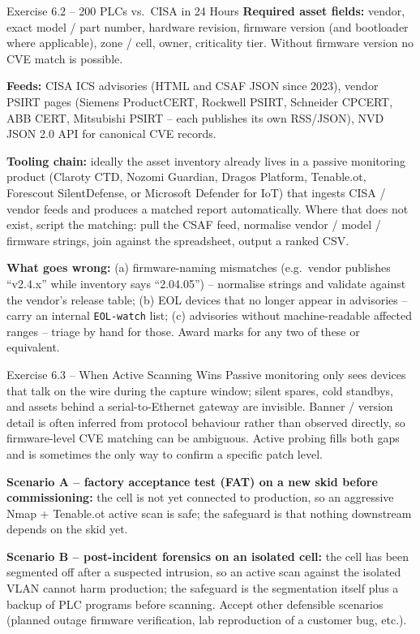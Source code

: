 \documentclass[11pt,a4paper]{article}
\begin{document}
\begin{taskbox}{Exercise 6.2 -- 200 PLCs vs.\ CISA in 24 Hours}
\textbf{Required asset fields:} vendor, exact model / part number,
hardware revision, firmware version (and bootloader where
applicable), zone / cell, owner, criticality tier. Without firmware
version no CVE match is possible.

\textbf{Feeds:} CISA ICS advisories (HTML and CSAF JSON since 2023),
vendor PSIRT pages (Siemens ProductCERT, Rockwell PSIRT, Schneider
CPCERT, ABB CERT, Mitsubishi PSIRT -- each publishes its own
RSS/JSON), NVD JSON 2.0 API for canonical CVE records.

\textbf{Tooling chain:} ideally the asset inventory already lives in
a passive monitoring product (Claroty CTD, Nozomi Guardian, Dragos
Platform, Tenable.ot, Forescout SilentDefense, or Microsoft Defender
for IoT) that ingests CISA / vendor feeds and produces a matched
report automatically. Where that does not exist, script the
matching: pull the CSAF feed, normalise vendor / model / firmware
strings, join against the spreadsheet, output a ranked CSV.

\textbf{What goes wrong:} (a) firmware-naming mismatches (e.g.\ vendor
publishes ``v2.4.x'' while inventory says ``2.04.05'') -- normalise
strings and validate against the vendor's release table; (b) EOL
devices that no longer appear in advisories -- carry an internal
\texttt{EOL-watch} list; (c) advisories without machine-readable
affected ranges -- triage by hand for those. Award marks for any
two of these or equivalent.
\end{taskbox}

\begin{taskbox}{Exercise 6.3 -- When Active Scanning Wins}
Passive monitoring only sees devices that talk on the wire during
the capture window; silent spares, cold standbys, and assets behind a
serial-to-Ethernet gateway are invisible. Banner / version detail is
often inferred from protocol behaviour rather than observed
directly, so firmware-level CVE matching can be ambiguous. Active
probing fills both gaps and is sometimes the only way to confirm a
specific patch level.

\textbf{Scenario A -- factory acceptance test (FAT) on a new skid
before commissioning:} the cell is not yet connected to production,
so an aggressive Nmap + Tenable.ot active scan is safe; the
safeguard is that nothing downstream depends on the skid yet.

\textbf{Scenario B -- post-incident forensics on an isolated cell:}
the cell has been segmented off after a suspected intrusion, so an
active scan against the isolated VLAN cannot harm production; the
safeguard is the segmentation itself plus a backup of PLC programs
before scanning. Accept other defensible scenarios (planned outage
firmware verification, lab reproduction of a customer bug, etc.).
\end{taskbox}
\end{document}

